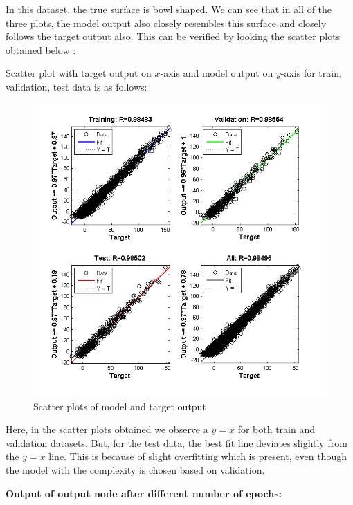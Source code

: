 \begin{flushleft}
In this dataset, the true surface is bowl shaped.  We can see that in all of the three plots, the model output also closely resembles this surface and closely follows the target output also. This can be verified by looking the scatter plots obtained below :
\end{flushleft}

Scatter plot with target output on $x$-axis and model output on $y$-axis for train, validation, test data is as follows:

\begin{figure}[H]
\centering
\includegraphics[width=\linewidth]{Regression/bivariate/scatter_1layer.png}
\caption{Scatter plots of model and target output}
\end{figure}

Here, in the scatter plots obtained we observe a $y = x$ for both train and validation datasets. But, for the test data, the best fit line deviates slightly from the $y = x$ line. This is because of slight overfitting which is present, even though the model with the complexity is chosen based on validation. 


\textbf{Output of output node after different number of epochs: } \\[10pt] 

